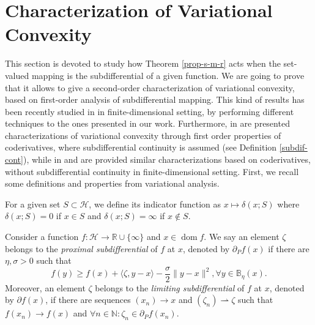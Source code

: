 \documentclass[smallextended,envcountsect,envcountsame]{svjour3}
\renewcommand{\H}{\mathcal{H}}
\newcommand{\R}{\mathbb{R}}
\newcommand{\N}{\mathbb{N}}
\newcommand{\dom}{\operatorname{dom}}
\newcommand{\1}{\mathds{1}}
\begin{document}
	\section{Characterization of Variational Convexity}
	
	This section is devoted to study how Theorem \ref{prop-s-m-r} acts when the set-valued mapping is the subdifferential of a given function. We are going to prove that it allows to give a second-order characterization of variational convexity, based on first-order analysis of subdifferential mapping. This kind of results has been recently studied in \cite{gfrerer2025} in finite-dimensional setting, by performing different techniques to the ones presented in our work. Furthermore, in \cite{MR4784083} are presented characterizations of variational convexity through first order properties of coderivatives, where subdifferential continuity is assumed  (see Definition \ref{subdif-cont}),  while in \cite[Theorem 5.5]{MR4887480} and \cite[Theorem 4.4]{khanh2025characterizations} are provided similar characterizations based on coderivatives, without subdifferential continuity in finite-dimensional setting. First, we recall some definitions and properties from variational analysis.

    For a given set $S\subset \H$, we define its indicator function as $x\mapsto \delta(x;S)$ where $\delta(x;S) = 0$ if $x\in S$ and $\delta(x;S) = \infty$ if $x\notin S$. 
    
    Consider a function $f\colon \H\to \R\cup\{\infty\}$ and $x\in \dom f$. We say an element $\zeta$ belongs to the \emph{proximal subdifferential} of $f$ at $x$, denoted by $\partial_P f(x)$ if there are $\eta,\sigma>0$ such that $$f(y)\geq f(x) + \langle \zeta,y-x\rangle - \frac{\sigma}{2}\|y-x\|^2, \forall y\in \mathbb{B}_\eta(x).$$
    Moreover, an element $\zeta$ belongs to the \emph{limiting subdifferential} of $f$ at $x$, denoted by $\partial f(x)$, if there are sequences $(x_n)\to x$ and $(\zeta_n)\rightharpoonup \zeta$ such that $f(x_n)\to f(x)$ and $\forall n\in\N:\zeta_n\in \partial_P f(x_n)$.
    
\end{document}
